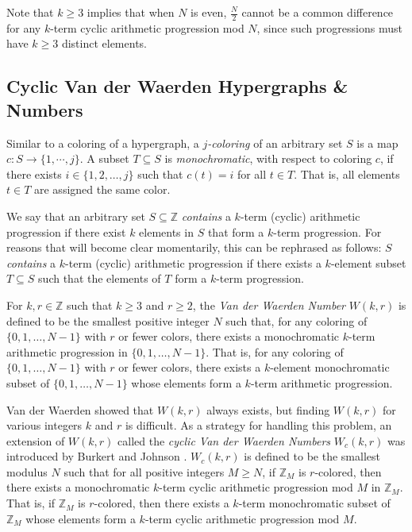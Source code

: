 \documentclass{article}
\theoremstyle{definition}
\theoremstyle{remark}
\begin{document}
Note that $k \geq 3$ implies that when $N$ is even, $\frac{N}{2}$ cannot be a common difference for any $k$-term cyclic arithmetic progression mod $N$, since such progressions must have $k \geq 3$ distinct elements.

\subsection{Cyclic Van der Waerden Hypergraphs \& Numbers}\label{sec:1.2}
Similar to a coloring of a hypergraph, a \textit{$j$-coloring} of an arbitrary set $S$ is a map $c : S \to \{1,\cdots,j\}$. A subset $T \subseteq S$ is \textit{monochromatic}, with respect to coloring $c$, if there exists $i \in \{1,2,\ldots,j\}$ such that $c(t) = i$ for all $t \in T$. That is, all elements $t \in T$ are assigned the same color.

We say that an arbitrary set $S \subseteq \mathbb{Z}$ \textit{contains} a $k$-term (cyclic) arithmetic progression 
if there exist $k$ elements in $S$ that form a $k$-term progression. For reasons that will become clear momentarily, this can be rephrased as follows: $S$ \textit{contains} a $k$-term (cyclic) arithmetic progression if there exists a $k$-element subset $T \subseteq S$ such that the elements of $T$ form a $k$-term progression.

For $k,r \in \mathbb{Z}$ such that $k \geq 3$ and $r \geq 2$, the \textit{Van der Waerden Number} $W(k,r)$ is defined to be the smallest positive integer $N$ such that, for any coloring of $\{0, 1,\ldots, N-1\}$ with $r$ or fewer colors, there exists a monochromatic $k$-term arithmetic progression in $\{0,1,\ldots,N-1\}$. That is, for any coloring of $\{0,1,\ldots,N-1\}$ with $r$ or fewer colors, there exists a $k$-element monochromatic subset of $\{0,1,\ldots,N-1\}$ whose elements form a $k$-term arithmetic progression.

Van der Waerden \cite{Waerden} showed that $W(k,r)$ always exists, but finding $W(k,r)$ for various integers $k$ and $r$ is difficult. As a strategy for handling this problem, an extension of $W(k,r)$ called the \textit{cyclic Van der Waerden Numbers} $W_{c}(k,r)$ was introduced by Burkert and Johnson \cite{Johnson}. $W_{c}(k,r)$ is defined to be the smallest modulus $N$ such that for all positive integers $M \geq N$, if $\mathbb{Z}_{M}$ is $r$-colored, then there exists a monochromatic $k$-term cyclic arithmetic progression mod $M$ in $\mathbb{Z}_{M}$. That is, if $\mathbb{Z}_{M}$ is $r$-colored, then there exists a $k$-term monochromatic subset of $\mathbb{Z}_{M}$ whose elements form a $k$-term cyclic arithmetic progression mod $M$. 
\end{document}
